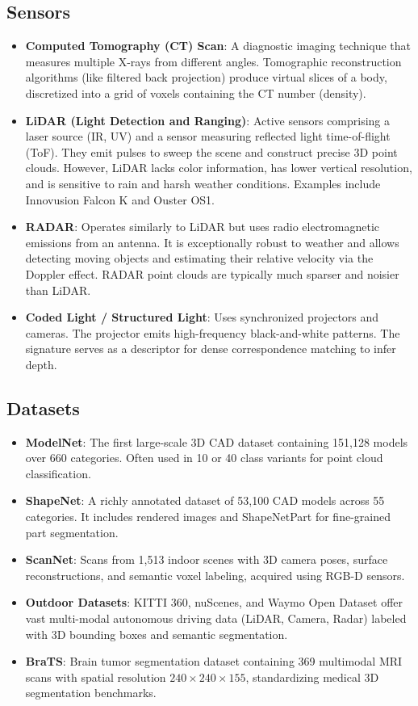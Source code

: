 \subsection{Sensors}
\begin{itemize}
    \item \textbf{Computed Tomography (CT) Scan}: A diagnostic imaging technique that measures multiple X-rays from different angles. Tomographic reconstruction algorithms (like filtered back projection) produce virtual slices of a body, discretized into a grid of voxels containing the CT number (density).
    \item \textbf{LiDAR (Light Detection and Ranging)}: Active sensors comprising a laser source (IR, UV) and a sensor measuring reflected light time-of-flight (ToF). They emit pulses to sweep the scene and construct precise 3D point clouds. However, LiDAR lacks color information, has lower vertical resolution, and is sensitive to rain and harsh weather conditions. Examples include Innovusion Falcon K and Ouster OS1.
    \item \textbf{RADAR}: Operates similarly to LiDAR but uses radio electromagnetic emissions from an antenna. It is exceptionally robust to weather and allows detecting moving objects and estimating their relative velocity via the Doppler effect. RADAR point clouds are typically much sparser and noisier than LiDAR.
    \item \textbf{Coded Light / Structured Light}: Uses synchronized projectors and cameras. The projector emits high-frequency black-and-white patterns. The signature serves as a descriptor for dense correspondence matching to infer depth.
\end{itemize}

\subsection{Datasets}
\begin{itemize}
    \item \textbf{ModelNet}: The first large-scale 3D CAD dataset containing 151,128 models over 660 categories. Often used in 10 or 40 class variants for point cloud classification.
    \item \textbf{ShapeNet}: A richly annotated dataset of 53,100 CAD models across 55 categories. It includes rendered images and ShapeNetPart for fine-grained part segmentation.
    \item \textbf{ScanNet}: Scans from 1,513 indoor scenes with 3D camera poses, surface reconstructions, and semantic voxel labeling, acquired using RGB-D sensors.
    \item \textbf{Outdoor Datasets}: KITTI 360, nuScenes, and Waymo Open Dataset offer vast multi-modal autonomous driving data (LiDAR, Camera, Radar) labeled with 3D bounding boxes and semantic segmentation.
    \item \textbf{BraTS}: Brain tumor segmentation dataset containing 369 multimodal MRI scans with spatial resolution $240 \times 240 \times 155$, standardizing medical 3D segmentation benchmarks.
\end{itemize}

